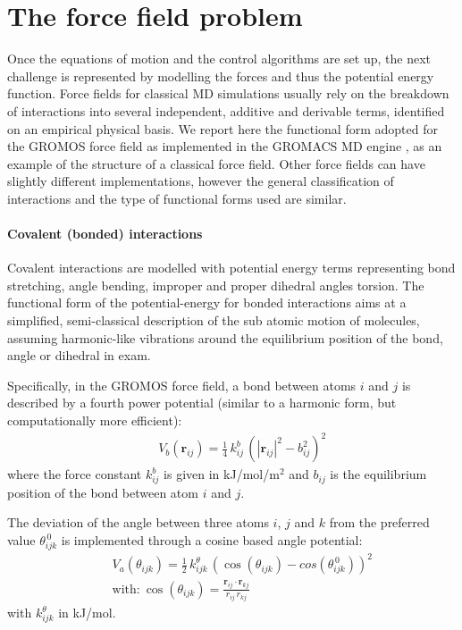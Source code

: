 \section{The force field problem} \label{sec:ff}

Once the equations of motion and the control algorithms are set up, the next challenge is represented by modelling the forces and thus the potential energy function.
%
Force fields for classical MD simulations usually rely on the breakdown of interactions into several independent, additive and derivable terms, identified on an empirical physical basis. We report here the functional form adopted for the GROMOS force field \citep{Oostenbrink2004,Schmid2011} as implemented in the GROMACS MD engine \citep{Berendsen1995,Abraham2015,gromacs_man}, as an example of the structure of a classical force field.
%
Other force fields can have slightly different implementations, however the general classification of interactions and the type of functional forms used are similar.

\paragraph{Covalent (bonded) interactions} Covalent interactions are modelled with potential energy terms representing bond stretching, angle bending, improper and proper dihedral angles torsion.
%
The functional form of the potential-energy for bonded interactions aims at a simplified, semi-classical description of the sub atomic motion of molecules, assuming harmonic-like vibrations around the equilibrium position of the bond, angle or dihedral in exam.

Specifically, in the GROMOS force field, a bond between atoms $i$ and $j$ is described by a fourth power potential (similar to a harmonic form, but computationally more efficient):
\begin{eqnarray}
&& V_b(\textbf{r}_{ij}) = \frac{1}{4}\,k^b_{ij}\,\left(|\textbf{r}_{ij}|^2 - b_{ij}^2\right)^2
\end{eqnarray}
where the force constant $k^b_{ij}$ is given in kJ/mol/m$^2$ and $b_{ij}$ is the equilibrium position of the bond between atom $i$ and $j$.

The deviation of the angle between three atoms $i$, $j$ and $k$ from the preferred value $\theta^{\, 0}_{ijk}$ is implemented through a cosine based angle potential:
\begin{eqnarray}
&& V_a(\theta_{ijk}) = \frac{1}{2}\,k^\theta_{ijk}\,\left(\cos\left(\theta_{ijk}\right) - cos\left(\theta^{\, 0}_{ijk}\right)\right)^2 \\
&& \text{with:} \ \cos\left(\theta_{ijk}\right) = \frac{\textbf{r}_{ij}\cdot \textbf{r}_{kj}}{r_{ij}\,r_{kj}}
\end{eqnarray}
with $k^\theta_{ijk}$ in kJ/mol.

